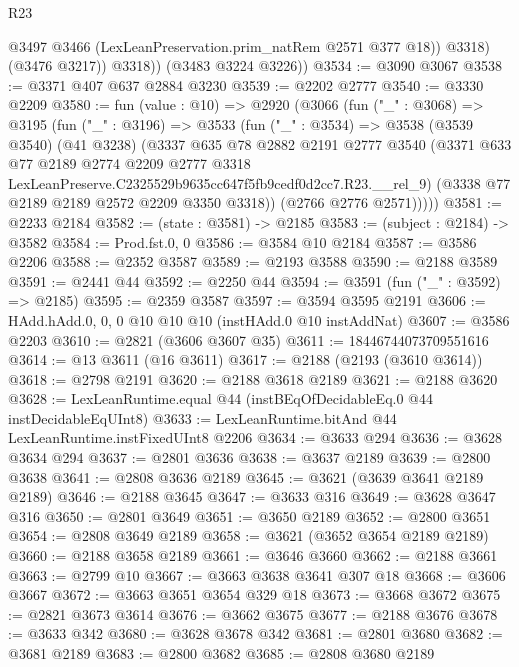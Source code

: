 \begin{lexlean}{R23}
\begin{coremodule}
                @3497
                @3466
                (LexLeanPreservation.prim_natRem @2571 @377 @18))
              @3318)
            (@3476 @3217))
          @3318))
      (@3483 @3224 @3226))
@3534 := @3090 @3067
@3538 := @3371 @407 @637 @2884 @3230
@3539 := @2202 @2777
@3540 := @3330 @2209
@3580 := fun (value : @10) =>
  @2920
    (@3066
      (fun ("_" : @3068) =>
      @3195
        (fun ("_" : @3196) =>
        @3533
          (fun ("_" : @3534) =>
          @3538
            (@3539 @3540)
            (@41 @3238)
            (@3337
              @635
              @78
              @2882
              @2191
              @2777
              @3540
              (@3371
                @633
                @77
                @2189
                @2774
                @2209
                @2777
                @3318
                LexLeanPreserve.C2325529b9635cc647f5fb9cedf0d2cc7.R23.__rel_9)
              (@3338 @77 @2189 @2189 @2572 @2209 @3350 @3318))
            (@2766 @2776 @2571)))))
@3581 := @2233 @2184
@3582 := (state : @3581) -> @2185
@3583 := (subject : @2184) -> @3582
@3584 := Prod.fst.{0, 0}
@3586 := @3584 @10 @2184
@3587 := @3586 @2206
@3588 := @2352 @3587
@3589 := @2193 @3588
@3590 := @2188 @3589
@3591 := @2441 @44
@3592 := @2250 @44
@3594 := @3591 (fun ("_" : @3592) => @2185)
@3595 := @2359 @3587
@3597 := @3594 @3595 @2191
@3606 := HAdd.hAdd.{0, 0, 0} @10 @10 @10 (instHAdd.{0} @10 instAddNat)
@3607 := @3586 @2203
@3610 := @2821 (@3606 @3607 @35)
@3611 := 18446744073709551616
@3614 := @13 @3611 (@16 @3611)
@3617 := @2188 (@2193 (@3610 @3614))
@3618 := @2798 @2191
@3620 := @2188 @3618 @2189
@3621 := @2188 @3620
@3628 := LexLeanRuntime.equal @44 (instBEqOfDecidableEq.{0} @44 instDecidableEqUInt8)
@3633 := LexLeanRuntime.bitAnd @44 LexLeanRuntime.instFixedUInt8 @2206
@3634 := @3633 @294
@3636 := @3628 @3634 @294
@3637 := @2801 @3636
@3638 := @3637 @2189
@3639 := @2800 @3638
@3641 := @2808 @3636 @2189
@3645 := @3621 (@3639 @3641 @2189 @2189)
@3646 := @2188 @3645
@3647 := @3633 @316
@3649 := @3628 @3647 @316
@3650 := @2801 @3649
@3651 := @3650 @2189
@3652 := @2800 @3651
@3654 := @2808 @3649 @2189
@3658 := @3621 (@3652 @3654 @2189 @2189)
@3660 := @2188 @3658 @2189
@3661 := @3646 @3660
@3662 := @2188 @3661
@3663 := @2799 @10
@3667 := @3663 @3638 @3641 @307 @18
@3668 := @3606 @3667
@3672 := @3663 @3651 @3654 @329 @18
@3673 := @3668 @3672
@3675 := @2821 @3673 @3614
@3676 := @3662 @3675
@3677 := @2188 @3676
@3678 := @3633 @342
@3680 := @3628 @3678 @342
@3681 := @2801 @3680
@3682 := @3681 @2189
@3683 := @2800 @3682
@3685 := @2808 @3680 @2189

\end{coremodule}
\end{lexlean}
